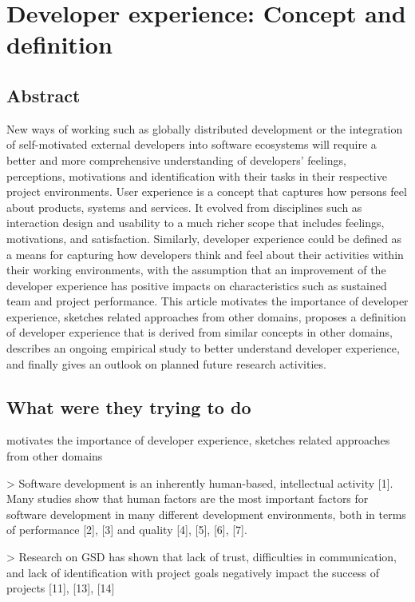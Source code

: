 \section{Developer experience: Concept and definition}

\subsection{Abstract}

New ways of working such as globally distributed development or the integration of self-motivated external developers into software ecosystems will require a better and more comprehensive understanding of developers' feelings, perceptions, motivations and identification with their tasks in their respective project environments. User experience is a concept that captures how persons feel about products, systems and services. It evolved from disciplines such as interaction design and usability to a much richer scope that includes feelings, motivations, and satisfaction. Similarly, developer experience could be defined as a means for capturing how developers think and feel about their activities within their working environments, with the assumption that an improvement of the developer experience has positive impacts on characteristics such as sustained team and project performance. This article motivates the importance of developer experience, sketches related approaches from other domains, proposes a definition of developer experience that is derived from similar concepts in other domains, describes an ongoing empirical study to better understand developer experience, and finally gives an outlook on planned future research activities.

\subsection{What were they trying to do}

motivates the importance of developer experience, sketches related approaches from other domains

> Software development is an inherently human-based, intellectual activity [1]. Many studies show that human factors are the most important factors for software development in many different development environments, both in terms of performance [2], [3] and quality [4], [5], [6], [7].

> Research on GSD has shown
that lack of trust, difficulties in communication, and lack
of identification with project goals negatively impact the
success of projects [11], [13], [14]

